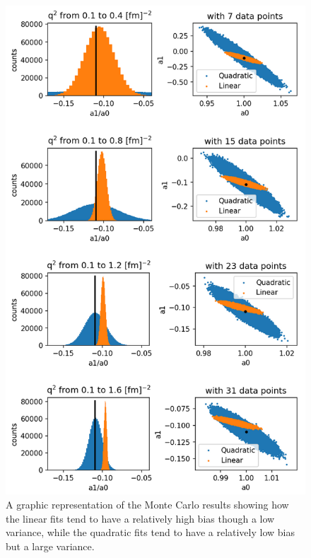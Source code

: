\documentclass[10pt,superscriptaddress,aps,prc,twocolumn]{revtex4-1}
\begin{document}
\begin{figure}[htbp]
\includegraphics[width=\columnwidth]{Figure/zresult.png}
\caption{A graphic representation of the Monte Carlo results showing how the linear fits tend to have a relatively
high bias though a low variance, while the quadratic fits tend to have a relatively low bias but a large variance.}
\label{mc-results}
\end{figure}
\end{document}
